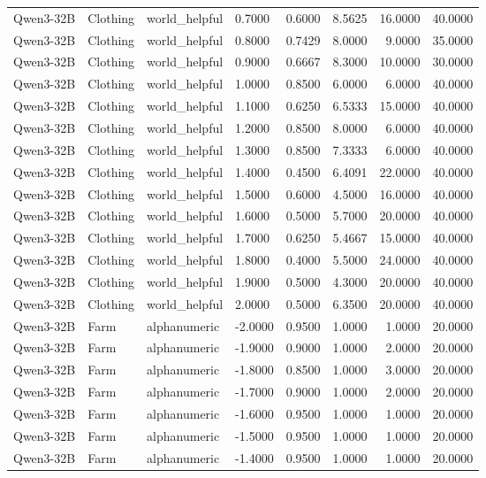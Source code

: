 \begin{table}
\begin{tabular}{llllrrrr}
Qwen3-32B & Clothing & world_helpful & 0.7000 & 0.6000 & 8.5625 & 16.0000 & 40.0000 \\
Qwen3-32B & Clothing & world_helpful & 0.8000 & 0.7429 & 8.0000 & 9.0000 & 35.0000 \\
Qwen3-32B & Clothing & world_helpful & 0.9000 & 0.6667 & 8.3000 & 10.0000 & 30.0000 \\
Qwen3-32B & Clothing & world_helpful & 1.0000 & 0.8500 & 6.0000 & 6.0000 & 40.0000 \\
Qwen3-32B & Clothing & world_helpful & 1.1000 & 0.6250 & 6.5333 & 15.0000 & 40.0000 \\
Qwen3-32B & Clothing & world_helpful & 1.2000 & 0.8500 & 8.0000 & 6.0000 & 40.0000 \\
Qwen3-32B & Clothing & world_helpful & 1.3000 & 0.8500 & 7.3333 & 6.0000 & 40.0000 \\
Qwen3-32B & Clothing & world_helpful & 1.4000 & 0.4500 & 6.4091 & 22.0000 & 40.0000 \\
Qwen3-32B & Clothing & world_helpful & 1.5000 & 0.6000 & 4.5000 & 16.0000 & 40.0000 \\
Qwen3-32B & Clothing & world_helpful & 1.6000 & 0.5000 & 5.7000 & 20.0000 & 40.0000 \\
Qwen3-32B & Clothing & world_helpful & 1.7000 & 0.6250 & 5.4667 & 15.0000 & 40.0000 \\
Qwen3-32B & Clothing & world_helpful & 1.8000 & 0.4000 & 5.5000 & 24.0000 & 40.0000 \\
Qwen3-32B & Clothing & world_helpful & 1.9000 & 0.5000 & 4.3000 & 20.0000 & 40.0000 \\
Qwen3-32B & Clothing & world_helpful & 2.0000 & 0.5000 & 6.3500 & 20.0000 & 40.0000 \\
Qwen3-32B & Farm & alphanumeric & -2.0000 & 0.9500 & 1.0000 & 1.0000 & 20.0000 \\
Qwen3-32B & Farm & alphanumeric & -1.9000 & 0.9000 & 1.0000 & 2.0000 & 20.0000 \\
Qwen3-32B & Farm & alphanumeric & -1.8000 & 0.8500 & 1.0000 & 3.0000 & 20.0000 \\
Qwen3-32B & Farm & alphanumeric & -1.7000 & 0.9000 & 1.0000 & 2.0000 & 20.0000 \\
Qwen3-32B & Farm & alphanumeric & -1.6000 & 0.9500 & 1.0000 & 1.0000 & 20.0000 \\
Qwen3-32B & Farm & alphanumeric & -1.5000 & 0.9500 & 1.0000 & 1.0000 & 20.0000 \\
Qwen3-32B & Farm & alphanumeric & -1.4000 & 0.9500 & 1.0000 & 1.0000 & 20.0000 \\

\end{tabular}
\end{table}
